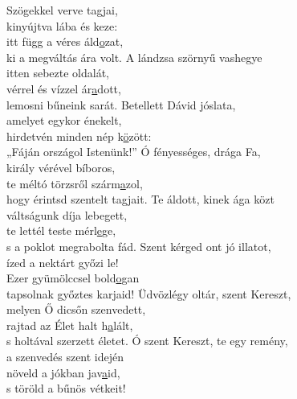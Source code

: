 \documentclass[twoside]{article}
\begin{document}
\begin{hymnstanzas}
  Szögekkel verve tagjai,\\
  kinyújtva lába és keze:\\
  itt függ a véres áld\underline{o}zat,\\
  ki a megváltás ára volt.
\stanzabreak
  A lándzsa szörnyű vashegye\\
  itten sebezte oldalát,\\
  vérrel és vízzel ár\underline{a}dott,\\
  lemosni bűneink sarát.
\stanzabreak
  Betellett Dávid jóslata,\\
  amelyet egykor énekelt,\\
  hirdetvén minden nép k\underline{ö}zött:\\
  „Fáján országol Istenünk!”
\stanzabreak
  Ó fényességes, drága Fa,\\
  király vérével bíboros,\\
  te méltó törzsről szárm\underline{a}zol,\\
  hogy érintsd szentelt tagjait.
\stanzabreak
  Te áldott, kinek ága közt\\
  váltságunk díja lebegett,\\
  te lettél teste mérl\underline{e}ge,\\
  s a poklot megrabolta fád.
\stanzabreak
  Szent kérged ont jó illatot,\\
  ízed a nektárt győzi le!\\
  Ezer gyümölccsel bold\underline{o}gan\\
  tapsolnak győztes karjaid!
\stanzabreak
  Üdvözlégy oltár, szent Kereszt,\\
  melyen Ő dicsőn szenvedett,\\
  rajtad az Élet halt h\underline{a}lált,\\
  s holtával szerzett életet.
\stanzabreak
  Ó szent Kereszt, te egy remény,\\
  a szenvedés szent idején\\
  növeld a jókban jav\underline{a}id,\\
  s töröld a bűnös vétkeit!
\end{hymnstanzas}
\end{document}

